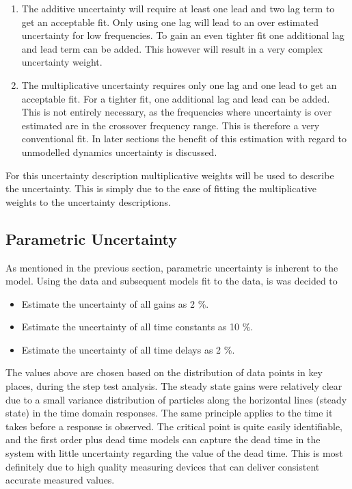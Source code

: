 \begin{enumerate}
	\item The additive uncertainty will require at least one lead and two lag term to get an acceptable fit. Only using one lag will lead to an over estimated uncertainty for low frequencies. To gain an even tighter fit one additional lag and lead term can be added. This however will result in a very complex uncertainty weight.
	\item The multiplicative uncertainty requires only one lag and one lead to get an acceptable fit. For a tighter fit, one additional lag and lead can be added. This is not entirely necessary, as the frequencies where uncertainty is over estimated are in the crossover frequency range. This is therefore a very conventional fit. In later sections the benefit of this estimation with regard to unmodelled dynamics uncertainty is discussed. 
\end{enumerate}

For this uncertainty description multiplicative weights will be used to describe the uncertainty. This is simply due to the ease of fitting the multiplicative weights to the uncertainty descriptions.

\subsection{Parametric Uncertainty}

As mentioned in the previous section, parametric uncertainty is inherent to the model. Using the data and subsequent models fit to the data, is was decided to

\begin{itemize}
	\item Estimate the uncertainty of all gains as 2 \%.
	\item Estimate the uncertainty of all time constants as 10 \%.
	\item Estimate the uncertainty of all time delays as 2 \%.
\end{itemize}

The values above are chosen based on the distribution of data points in key places, during the step test analysis. The steady state gains were relatively clear due to a small variance distribution of particles along the horizontal lines (steady state) in the time domain responses. The same principle applies to the time it takes before a response is observed. The critical point is quite easily identifiable, and the first order plus dead time models can capture the dead time in the system with little uncertainty regarding the value of the dead time. This is most definitely due to high quality measuring devices that can deliver consistent accurate measured values.

